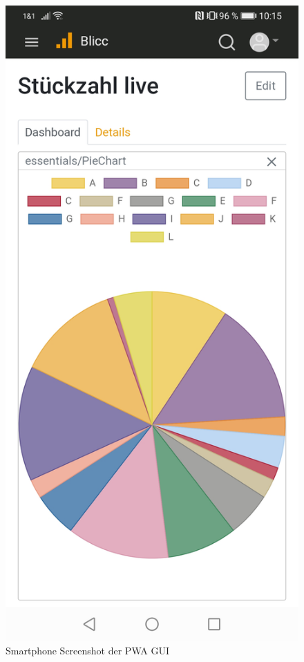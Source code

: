 \begin{figure}
    \includegraphics[scale=0.15]{img/DashboardHandy}
    \caption{Smartphone Screenshot der PWA GUI}
\end{figure}
